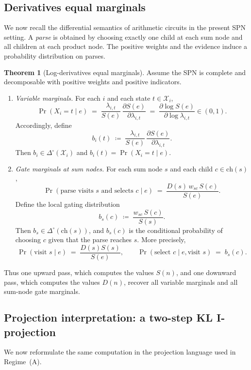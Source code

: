 \documentclass[12pt]{article}
\newcommand{\1}{\mathbb{1}}
\newcommand{\defeq}{\coloneq}
\theoremstyle{definition}
\newtheorem{theorem}{Theorem}[section]
\begin{document}
\subsection{Derivatives equal marginals}
\label{subsec:spn-deriv-marg}

We now recall the differential semantics of arithmetic circuits in the present SPN setting. A \emph{parse} is obtained by choosing exactly one child at each sum node and all children at each product node. The positive weights and the evidence induce a probability distribution on parses.

\begin{theorem}[Log-derivatives equal marginals]
\label{thm:spn-derivatives-are-marginals}
Assume the SPN is complete and decomposable with positive weights and positive indicators.

\begin{enumerate}[label=(\alph*),leftmargin=2em,itemsep=0.25em]
\item \emph{Variable marginals.}
For each $i$ and each state $t\in\mathcal X_i$,
\[
\Pr(X_i=t\mid e)
\;=\;
\frac{\lambda_{i,t}}{S(e)}\,\frac{\partial S(e)}{\partial \lambda_{i,t}}
\;=\;
\frac{\partial \log S(e)}{\partial \log \lambda_{i,t}}
\in(0,1).
\]
Accordingly, define
\[
b_i(t)\;\defeq\;\frac{\lambda_{i,t}}{S(e)}\,\frac{\partial S(e)}{\partial \lambda_{i,t}}.
\]
Then $b_i\in\Delta^\circ(\mathcal X_i)$ and $b_i(t)=\Pr(X_i=t\mid e)$.

\item \emph{Gate marginals at sum nodes.}
For each sum node $s$ and each child $c\in\mathrm{ch}(s)$,
\[
\Pr(\text{parse visits }s \text{ and selects }c\mid e)
\;=\;
\frac{D(s)\,w_{sc}\,S(c)}{S(e)}.
\]
Define the local gating distribution
\[
b_s(c)\;\defeq\;\frac{w_{sc}\,S(c)}{S(s)}.
\]
Then $b_s\in\Delta^\circ(\mathrm{ch}(s))$, and $b_s(c)$ is the conditional probability of choosing $c$ given that the parse reaches $s$. More precisely,
\[
\Pr(\text{visit }s\mid e)\;=\;\frac{D(s)S(s)}{S(e)},
\qquad
\Pr(\text{select }c\mid e,\text{visit }s)\;=\;b_s(c).
\]
\end{enumerate}

Thus one upward pass, which computes the values $S(n)$, and one downward pass, which computes the values $D(n)$, recover all variable marginals and all sum-node gate marginals.
\end{theorem}

\subsection{Projection interpretation: a two-step KL I-projection}
\label{subsec:spn-projection}
We now reformulate the same computation in the projection language used in Regime~(A).
\end{document}
